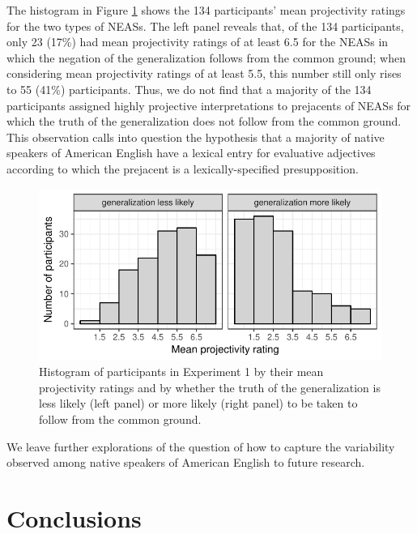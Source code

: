 \documentclass[11pt,fleqn]{article}
\newcommand{\6}{\mbox{$[\hspace*{-.6mm}[$}}
\newcommand{\9}{\mbox{$]\hspace*{-.6mm}]$}}
\begin{document}
The histogram in Figure \ref{f-dialect} shows the 134 participants' mean projectivity ratings for the two types of NEASs. The left panel reveals that, of the 134 participants, only 23 (17\%) had mean projectivity ratings of at least 6.5 for the NEASs in which the negation of the generalization follows from the common ground; when considering mean projectivity ratings of at least 5.5, this number still only rises to 55 (41\%) participants. Thus, we do not find that a majority of the 134 participants assigned highly projective interpretations to prejacents of NEASs for which the truth of the generalization does not follow from the common ground. This observation calls into question the hypothesis that a majority of native speakers of American English have a lexical entry for evaluative adjectives according to which the prejacent is a lexically-specified presupposition. 

\begin{figure}[h!]
\begin{center}
\includegraphics[scale=.9]{figures/count-of-participants}

\caption{Histogram of participants in Experiment 1 by their mean projectivity ratings and by whether the truth of the generalization is less likely (left panel) or more likely (right panel) to be taken to follow from the common ground.	}\label{f-dialect}
\end{center}
\end{figure}

We leave further explorations of the question of how to capture the variability observed among native speakers of American English to future research.

\section{Conclusions}\label{s6}
\end{document}
